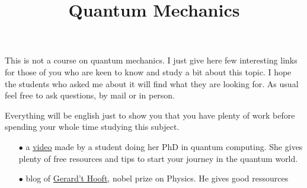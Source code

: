 \documentclass[10pt,twoside]{article}
\begin{document}
\title{Quantum Mechanics }


\maketitle

This is not a course on quantum mechanics. I just give here few interesting links for those of you who are keen to know and study a bit about this topic. I hope the students who asked me about it will find what they are looking for. As usual feel free to ask questions, by mail or in person.\par

\medskip

Everything will be english just to show you that you have plenty of work before spending your whole time studying this subject.

\bigskip

\begin{itemize}
  \item[$\bullet$] a \href{https://youtu.be/Rs572Cf4zkk}{video} made by a student doing her PhD in quantum computing. She gives plenty of free resources and tips to start your journey in the quantum world.
  \item[$\bullet$] blog of \href{https://webspace.science.uu.nl/~gadda001/goodtheorist/qmech.html}{Gerard't Hooft}, nobel prize on Physics. He gives good ressources
\end{itemize}
\end{document}
